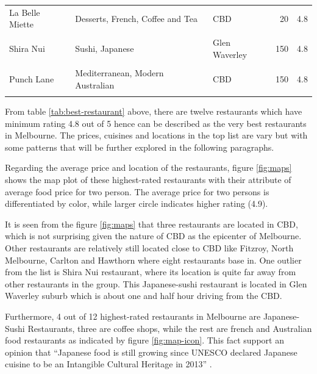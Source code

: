 \documentclass[11pt,a4paper,]{article}
\begin{document}
\begin{table}[!h]
\begin{tabular}[t]{l|l|l|r|r}
\hline
\cellcolor{pink}{Aka Siro} & \cellcolor{pink}{Japanese} & \cellcolor{pink}{Collingwood} & \cellcolor{pink}{80} & \cellcolor{pink}{4.8}\\
\hline
La Belle Miette & Desserts, French, Coffee and Tea & CBD & 20 & 4.8\\
\hline
\cellcolor{pink}{Attica} & \cellcolor{pink}{Australian, Contemporary} & \cellcolor{pink}{Ripponlea} & \cellcolor{pink}{600} & \cellcolor{pink}{4.8}\\
\hline
Shira Nui & Sushi, Japanese & Glen Waverley & 150 & 4.8\\
\hline
\cellcolor{pink}{The Proud Peacock} & \cellcolor{pink}{Chinese, Thai, Vietnamese} & \cellcolor{pink}{Mount Waverley} & \cellcolor{pink}{45} & \cellcolor{pink}{4.8}\\
\hline
Punch Lane & Mediterranean, Modern Australian & CBD & 150 & 4.8\\
\hline
\cellcolor{pink}{Burch \& Purchese Sweet Studio} & \cellcolor{pink}{Desserts} & \cellcolor{pink}{South Yarra} & \cellcolor{pink}{25} & \cellcolor{pink}{4.8}\\
\hline
\end{tabular}
\end{table}

From table \ref{tab:best-restaurant} above, there are twelve restaurants which have minimum rating 4.8 out of 5 hence can be described as the very best restaurants in Melbourne. The prices, cuisines and locations in the top list are vary but with some patterns that will be further explored in the following paragraphs.

Regarding the average price and location of the restaurants, figure \ref{fig:maps} shows the map plot of these highest-rated restaurants with their attribute of average food price for two person. The average price for two persons is differentiated by color, while larger circle indicates higher rating (4.9).

It is seen from the figure \ref{fig:maps} that three restaurants are located in CBD, which is not surprising given the nature of CBD as the epicenter of Melbourne. Other restaurants are relatively still located close to CBD like Fitzroy, North Melbourne, Carlton and Hawthorn where eight restaurants base in. One outlier from the list is Shira Nui restaurant, where its location is quite far away from other restaurants in the group. This Japanese-sushi restaurant is located in Glen Waverley suburb which is about one and half hour driving from the CBD.

Furthermore, 4 out of 12 highest-rated restaurants in Melbourne are Japanese-Sushi Restaurants, three are coffee shops, while the rest are french and Australian food restaurants as indicated by figure \ref{fig:map-icon}. This fact support an opinion that ``Japanese food is still growing since UNESCO declared Japanese cuisine to be an Intangible Cultural Heritage in 2013'' \textcite{sushi}.
\end{document}
